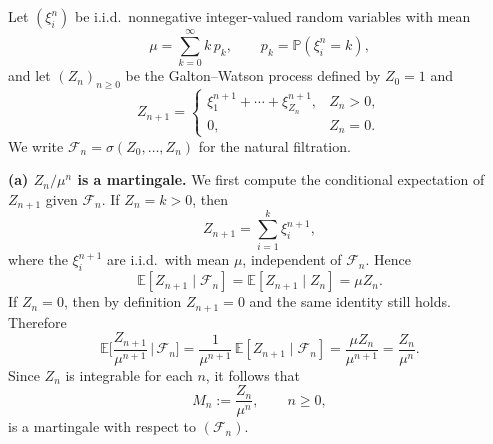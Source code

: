 \documentclass[answers,12pt,addpoints]{exam}
\begin{document}
\begin{questions}

\begin{solution}
Let $(\xi_i^n)$ be i.i.d.\ nonnegative integer-valued random variables with mean
\[
\mu = \sum_{k=0}^\infty k\,p_k, \qquad p_k = \mathbb{P}(\xi_i^n = k),
\]
and let $(Z_n)_{n\ge 0}$ be the Galton--Watson process defined by $Z_0 = 1$ and
\[
Z_{n+1} =
\begin{cases}
\xi^{n+1}_1 + \cdots + \xi^{n+1}_{Z_n}, & Z_n > 0,\\
0, & Z_n = 0.
\end{cases}
\]
We write $\mathcal{F}_n = \sigma(Z_0,\dots,Z_n)$ for the natural filtration.

\medskip

\textbf{(a) $Z_n/\mu^n$ is a martingale.}
We first compute the conditional expectation of $Z_{n+1}$ given $\mathcal{F}_n$.
If $Z_n = k>0$, then
\[
Z_{n+1} = \sum_{i=1}^{k} \xi^{n+1}_i,
\]
where the $\xi^{n+1}_i$ are i.i.d.\ with mean $\mu$, independent of $\mathcal{F}_n$. Hence
\[
\mathbb{E}[Z_{n+1} \mid \mathcal{F}_n]
= \mathbb{E}[Z_{n+1} \mid Z_n]
= \mu Z_n.
\]
If $Z_n = 0$, then by definition $Z_{n+1} = 0$ and the same identity still holds. Therefore
\[
\mathbb{E}\Big[\frac{Z_{n+1}}{\mu^{n+1}} \,\Big|\, \mathcal{F}_n\Big]
= \frac{1}{\mu^{n+1}}\,\mathbb{E}[Z_{n+1} \mid \mathcal{F}_n]
= \frac{\mu Z_n}{\mu^{n+1}}
= \frac{Z_n}{\mu^n}.
\]
Since $Z_n$ is integrable for each $n$, it follows that
\[
M_n := \frac{Z_n}{\mu^n}, \qquad n\ge 0,
\]
is a martingale with respect to $(\mathcal{F}_n)$.


\end{solution}
\end{questions}
\end{document}

